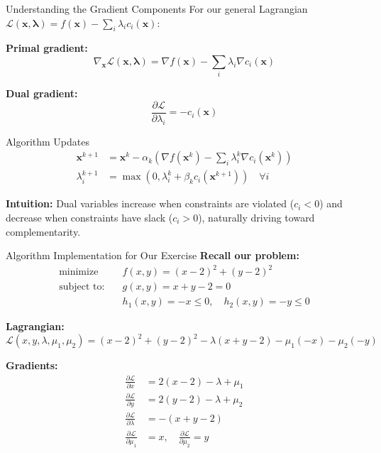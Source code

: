 \documentclass[aspectratio=1610]{beamer}
\begin{document}
\begin{frame}{Understanding the Gradient Components}
  For our general Lagrangian $\mathcal{L}(\mathbf{x}, \boldsymbol{\lambda}) = f(\mathbf{x}) - \sum_{i} \lambda_i c_i(\mathbf{x})$:
  
  \vspace{0.3cm}
  \textbf{Primal gradient:}
  $$\nabla_{\mathbf{x}} \mathcal{L}(\mathbf{x}, \boldsymbol{\lambda}) = \nabla f(\mathbf{x}) - \sum_{i} \lambda_i \nabla c_i(\mathbf{x})$$
  
  \textbf{Dual gradient:}
  $$\frac{\partial \mathcal{L}}{\partial \lambda_i} = -c_i(\mathbf{x})$$
  
  \vspace{0.3cm}
  \begin{block}{Algorithm Updates}
    \begin{align}
      \mathbf{x}^{k+1} &= \mathbf{x}^k - \alpha_k \left(\nabla f(\mathbf{x}^k) - \sum_{i} \lambda_i^k \nabla c_i(\mathbf{x}^k)\right)\\
      \lambda_i^{k+1} &= \max(0, \lambda_i^k + \beta_k c_i(\mathbf{x}^{k+1})) \quad \forall i
    \end{align}
  \end{block}
  
  \textbf{Intuition:} Dual variables increase when constraints are violated ($c_i < 0$) and decrease when constraints have slack ($c_i > 0$), naturally driving toward complementarity.
\end{frame}

\begin{frame}{Algorithm Implementation for Our Exercise}
  \textbf{Recall our problem:}
  \begin{align}
    \text{minimize} \quad & f(x,y) = (x-2)^2 + (y-2)^2 \\
    \text{subject to:} \quad & g(x,y) = x + y - 2 = 0 \\
    & h_1(x,y) = -x \leq 0, \quad h_2(x,y) = -y \leq 0
  \end{align}
  
  \textbf{Lagrangian:}
  $$\mathcal{L}(x,y,\lambda,\mu_1,\mu_2) = (x-2)^2 + (y-2)^2 - \lambda(x + y - 2) - \mu_1(-x) - \mu_2(-y)$$
  
  \textbf{Gradients:}
  \begin{align}
    \frac{\partial \mathcal{L}}{\partial x} &= 2(x-2) - \lambda + \mu_1\\
    \frac{\partial \mathcal{L}}{\partial y} &= 2(y-2) - \lambda + \mu_2\\
    \frac{\partial \mathcal{L}}{\partial \lambda} &= -(x + y - 2)\\
    \frac{\partial \mathcal{L}}{\partial \mu_1} &= x, \quad \frac{\partial \mathcal{L}}{\partial \mu_2} = y
  \end{align}
\end{frame}
\end{document}

